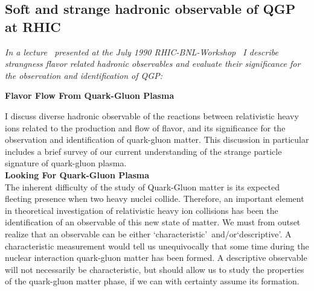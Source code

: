 \subsection{Soft and strange hadronic observable of QGP at RHIC}
\textit{%
In a lecture~\cite{Rafelski:1990dk}  presented at the July 1990  RHIC-BNL-Workshop~\cite{Fatyga:1990ubn}  I describe strangness flavor related hadronic observables  and evaluate their significance for the observation and identification of QGP:}\\[-0.7cm]
 \begin{mdframed}[linecolor=gray,roundcorner=12pt,backgroundcolor=Dandelion!15,linewidth=1pt,leftmargin=0cm,rightmargin=0cm,topline=true,bottomline=true,skipabove=12pt]\relax%
%
\centerline{\bf\Large Flavor Flow From Quark-Gluon Plasma}
I discuss diverse hadronic observable of the reactions between relativistic heavy ions related to the production and flow of flavor, and its significance for the observation and identification of quark-gluon matter. This discussion in particular includes a brief survey of our current understanding of the strange particle signature of quark-gluon plasma.\\[0.5cm]
\noindent\textbf{\large Looking For Quark-Gluon Plasma}\\[0.1cm]
The inherent difficulty of the study of Quark-Gluon matter is its expected fleeting presence when two heavy nuclei collide. Therefore, an important element in theoretical investigation of relativistic heavy ion collisions has been the identification of an observable of this new state of matter. We must from outset realize that an observable can be either \lq characteristic\rq\ and/or\lq descriptive\rq. A characteristic measurement would tell us unequivocally that some time during the nuclear interaction quark-gluon matter has been formed. A descriptive observable will not necessarily be characteristic, but should allow us to study the properties of the quark-gluon matter phase, if we can with certainty assume its formation.  
 

\end{mdframed}
